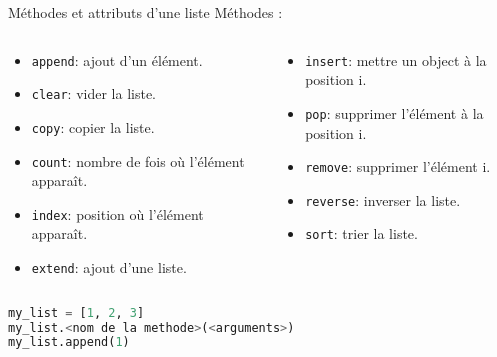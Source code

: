 \begin{frame}[fragile]{Méthodes et attributs d'une liste}
  Méthodes :
  \begin{columns}[T]
    \begin{column}{.48\textwidth}
      \begin{itemize}
        \item \texttt{append}: ajout d'un élément.
        \item \texttt{clear}: vider la liste.
        \item \texttt{copy}: copier la liste.
        \item \texttt{count}: nombre de fois où l'élément apparaît.
        \item \texttt{index}: position où l'élément apparaît.
        \item \texttt{extend}: ajout d'une liste.
      \end{itemize}
    \end{column}

    \begin{column}{.48\textwidth}
      \begin{itemize}
        \item \texttt{insert}: mettre un object à la position i.
        \item \texttt{pop}: supprimer l'élément à la position i.
        \item \texttt{remove}: supprimer l'élément i.
        \item \texttt{reverse}: inverser la liste.
        \item \texttt{sort}: trier la liste.
      \end{itemize}
    \end{column}
  \end{columns}

  \bigskip

\begin{lstlisting}[language=Python, numbers=none]
my_list = [1, 2, 3]
my_list.<nom de la methode>(<arguments>)
my_list.append(1)
\end{lstlisting}
\end{frame}


